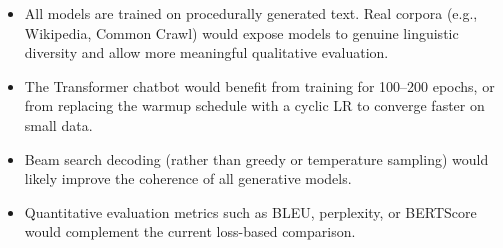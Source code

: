 \begin{itemize}
    \item All models are trained on procedurally generated text. Real corpora
          (e.g., Wikipedia, Common Crawl) would expose models to genuine linguistic
          diversity and allow more meaningful qualitative evaluation.
    \item The Transformer chatbot would benefit from training for 100–200 epochs,
          or from replacing the warmup schedule with a cyclic LR to converge
          faster on small data.
    \item Beam search decoding (rather than greedy or temperature sampling) would
          likely improve the coherence of all generative models.
    \item Quantitative evaluation metrics such as BLEU, perplexity, or BERTScore
          would complement the current loss-based comparison.
\end{itemize}
